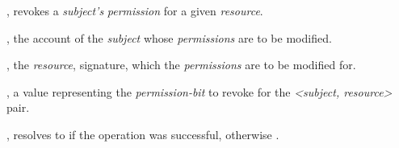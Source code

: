 \begin{interface}
\begin{functions}
    \item {},
      revokes a \emph{subject's} \emph{permission} for a given \emph{resource}.

      \begin{parameters}
        \item {}, the account  of the
          \emph{subject} whose \emph{permissions} are to be modified.

        \item {}, the \emph{resource}, 
          signature, which the \emph{permissions} are to be modified for.

        \item {}, a  value representing the
          \emph{permission-bit} to revoke for the \emph{<subject, resource>}
          pair.
      \end{parameters}

      \begin{returns}
      \item {}, resolves to  if the operation was
        successful, otherwise .
      \end{returns}
  \end{functions}
\end{interface}

